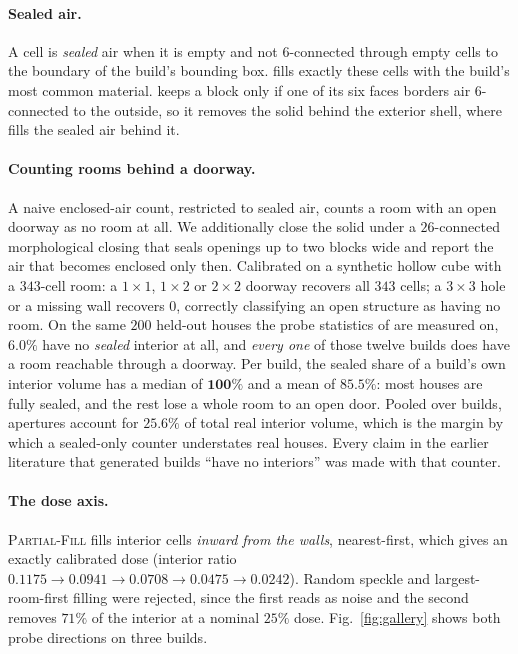 \paragraph{Sealed air.} A cell is \emph{sealed} air when it is empty and not
$6$-connected through empty cells to the boundary of the build's bounding box.
\solidify{} fills exactly these cells with the build's most common material.
\hollow{} keeps a block only if one of its six faces borders air $6$-connected
to the outside, so it removes the solid behind the exterior shell, where \solidify{} fills
the sealed air behind it.

\paragraph{Counting rooms behind a doorway.} A naive enclosed-air count,
restricted to sealed air, counts a room with an open doorway as no room at all.
We additionally close the solid under a $26$-connected morphological closing
that seals openings up to two blocks wide and report the air that becomes
enclosed only then. Calibrated on a synthetic hollow cube with a $343$-cell room:
a $1{\times}1$, $1{\times}2$ or $2{\times}2$ doorway recovers all $343$ cells; a
$3{\times}3$ hole or a missing wall recovers $0$, correctly classifying an open
structure as having no room. On the same $200$ held-out houses the probe
statistics of  are measured on, $\mathbf{6.0\%}$ have no
\emph{sealed} interior at all, and \emph{every one} of those twelve builds does
have a room reachable through a doorway. Per build, the sealed share of a
build's own interior volume has a median of $\mathbf{100\%}$ and a mean of
$\mathbf{85.5\%}$: most houses are fully sealed, and the rest lose a whole room
to an open door. Pooled over builds, apertures account for $\mathbf{25.6\%}$ of
total real interior volume, which is the margin by which a sealed-only counter
understates real houses. Every claim in the earlier literature that generated
builds ``have no interiors'' was made with that counter.

\paragraph{The dose axis.} \textsc{Partial-Fill} fills interior cells
\emph{inward from the walls}, nearest-first, which gives an exactly calibrated
dose (interior ratio $0.1175 \to 0.0941 \to 0.0708 \to 0.0475 \to 0.0242$).
Random speckle and largest-room-first filling were rejected, since the first
reads as noise and the second removes $71\%$ of the interior at a nominal $25\%$
dose. Fig.~\ref{fig:gallery} shows both probe directions on three builds.

